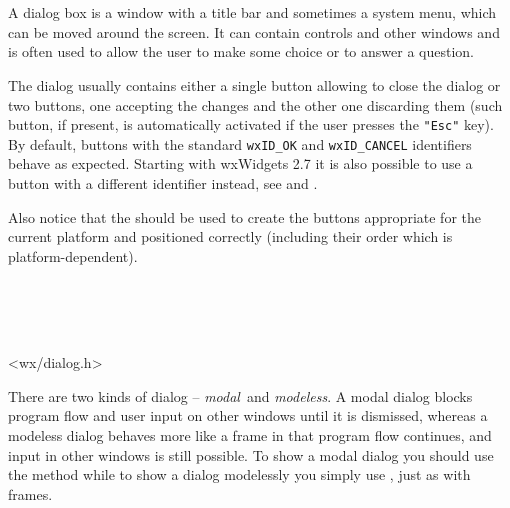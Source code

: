 
\section{}\label{wxdialog}

A dialog box is a window with a title bar and sometimes a system menu, which
can be moved around the screen. It can contain controls and other windows and
is often used to allow the user to make some choice or to answer a question.



The dialog usually contains either a single button allowing to close the
dialog or two buttons, one accepting the changes and the other one discarding
them (such button, if present, is automatically activated if the user presses
the \texttt{"Esc"} key). By default, buttons with the standard \texttt{wxID\_OK} 
and \texttt{wxID\_CANCEL} identifiers behave as expected. Starting with
wxWidgets 2.7 it is also possible to use a button with a different identifier
instead, see  and 
.

Also notice that the  
should be used to create the buttons appropriate for the current platform and
positioned correctly (including their order which is platform-dependent).




\\
\\
\\


<wx/dialog.h>


There are two kinds of dialog -- {\it modal}\ and {\it modeless}. A modal dialog
blocks program flow and user input on other windows until it is dismissed,
whereas a modeless dialog behaves more like a frame in that program flow
continues, and input in other windows is still possible. To show a modal dialog
you should use the  method while to show
a dialog modelessly you simply use , just as with
frames.

